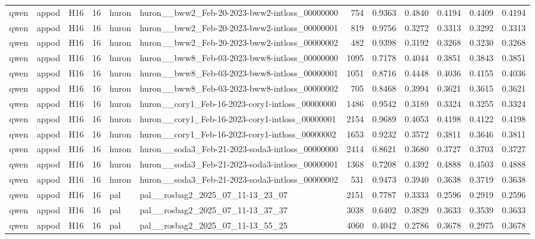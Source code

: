 \begin{table}[tbp]
\begin{tabular}{lllrllrrrrrr}
qwen & appod & H16 & 16 & huron & huron\_\_bww2\_Feb-20-2023-bww2-intloss\_00000000 & 754 & 0.9363 & 0.4840 & 0.4194 & 0.4409 & 0.4194 \\
qwen & appod & H16 & 16 & huron & huron\_\_bww2\_Feb-20-2023-bww2-intloss\_00000001 & 819 & 0.9756 & 0.3272 & 0.3313 & 0.3292 & 0.3313 \\
qwen & appod & H16 & 16 & huron & huron\_\_bww2\_Feb-20-2023-bww2-intloss\_00000002 & 482 & 0.9398 & 0.3192 & 0.3268 & 0.3230 & 0.3268 \\
qwen & appod & H16 & 16 & huron & huron\_\_bww8\_Feb-03-2023-bww8-intloss\_00000000 & 1095 & 0.7178 & 0.4044 & 0.3851 & 0.3843 & 0.3851 \\
qwen & appod & H16 & 16 & huron & huron\_\_bww8\_Feb-03-2023-bww8-intloss\_00000001 & 1051 & 0.8716 & 0.4448 & 0.4036 & 0.4155 & 0.4036 \\
qwen & appod & H16 & 16 & huron & huron\_\_bww8\_Feb-03-2023-bww8-intloss\_00000002 & 705 & 0.8468 & 0.3994 & 0.3621 & 0.3615 & 0.3621 \\
qwen & appod & H16 & 16 & huron & huron\_\_cory1\_Feb-16-2023-cory1-intloss\_00000000 & 1486 & 0.9542 & 0.3189 & 0.3324 & 0.3255 & 0.3324 \\
qwen & appod & H16 & 16 & huron & huron\_\_cory1\_Feb-16-2023-cory1-intloss\_00000001 & 2154 & 0.9689 & 0.4053 & 0.4198 & 0.4122 & 0.4198 \\
qwen & appod & H16 & 16 & huron & huron\_\_cory1\_Feb-16-2023-cory1-intloss\_00000002 & 1653 & 0.9232 & 0.3572 & 0.3811 & 0.3646 & 0.3811 \\
qwen & appod & H16 & 16 & huron & huron\_\_soda3\_Feb-21-2023-soda3-intloss\_00000000 & 2414 & 0.8621 & 0.3680 & 0.3727 & 0.3703 & 0.3727 \\
qwen & appod & H16 & 16 & huron & huron\_\_soda3\_Feb-21-2023-soda3-intloss\_00000001 & 1368 & 0.7208 & 0.4392 & 0.4888 & 0.4503 & 0.4888 \\
qwen & appod & H16 & 16 & huron & huron\_\_soda3\_Feb-21-2023-soda3-intloss\_00000002 & 531 & 0.9473 & 0.3940 & 0.3638 & 0.3719 & 0.3638 \\
qwen & appod & H16 & 16 & pal & pal\_\_rosbag2\_2025\_07\_11-13\_23\_07 & 2151 & 0.7787 & 0.3333 & 0.2596 & 0.2919 & 0.2596 \\
qwen & appod & H16 & 16 & pal & pal\_\_rosbag2\_2025\_07\_11-13\_37\_37 & 3038 & 0.6402 & 0.3829 & 0.3633 & 0.3539 & 0.3633 \\
qwen & appod & H16 & 16 & pal & pal\_\_rosbag2\_2025\_07\_11-13\_55\_25 & 4060 & 0.4042 & 0.2786 & 0.3678 & 0.2975 & 0.3678 \\

\end{tabular}
\end{table}
